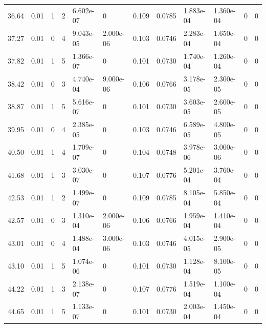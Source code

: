 \documentclass[preview]{standalone}
\begin{document}
{{{\begin{tabular}{L{1.2cm}C{1.2cm} C{0.3cm}C{0.5cm} C{1.4cm}C{1.4cm} C{1.4cm}C{1.4cm} C{1.6cm}C{1.6cm} C{1.6cm}C{1.6cm}}
  36.64  &  0.01  & 1     &  2 &  6.602e-07  & 0  &  0.109&   0.0785& 1.883e-04 & 1.360e-04   &  0 & 0  \\ 
  37.27  &  0.01  & 0     &  4 &  9.043e-05  & 2.000e-06  &  0.103&   0.0746& 2.283e-04 & 1.650e-04   &  0 & 0  \\ 
  37.82  &  0.01  & 1     &  5 &  1.366e-07  & 0  &  0.101&   0.0730& 1.740e-04 & 1.260e-04   &  0 & 0  \\ 
  38.42  &  0.01  & 0     &  3 &  4.740e-04  & 9.000e-06  &  0.106&   0.0766& 3.178e-05 & 2.300e-05   &  0 & 0  \\ 
  38.87  &  0.01  & 1     &  5 &  5.616e-07  & 0  &  0.101&   0.0730& 3.603e-05 & 2.600e-05   &  0 & 0  \\ 
  39.95  &  0.01  & 0     &  4 &  2.385e-05  & 0  &  0.103&   0.0746& 6.589e-05 & 4.800e-05   &  0 & 0  \\ 
  40.50  &  0.01  & 1     &  4 &  1.709e-07  & 0  &  0.104&   0.0748& 3.978e-06 & 3.000e-06   &  0 & 0  \\ 
  41.68  &  0.01  & 1     &  3 &  3.030e-07  & 0  &  0.107&   0.0776& 5.201e-04 & 3.760e-04   &  0 & 0  \\ 
  42.53  &  0.01  & 1     &  2 &  1.499e-07  & 0  &  0.109&   0.0785& 8.105e-04 & 5.850e-04   &  0 & 0  \\ 
  42.57  &  0.01  & 0     &  3 &  1.310e-04  & 2.000e-06  &  0.106&   0.0766& 1.959e-04 & 1.410e-04   &  0 & 0  \\ 
  43.01  &  0.01  & 0     &  4 &  1.488e-04  & 3.000e-06  &  0.103&   0.0746& 4.015e-05 & 2.900e-05   &  0 & 0  \\ 
  43.10  &  0.01  & 1     &  5 &  1.074e-06  & 0  &  0.101&   0.0730& 1.128e-04 & 8.100e-05   &  0 & 0  \\ 
  44.22  &  0.01  & 1     &  3 &  2.138e-07  & 0  &  0.107&   0.0776& 1.519e-04 & 1.100e-04   &  0 & 0  \\ 
  44.65  &  0.01  & 1     &  5 &  1.133e-07  & 0  &  0.101&   0.0730& 2.003e-04 & 1.450e-04   &  0 & 0  \\ 
\hline 
\end{tabular} 

}}}
\end{document}
